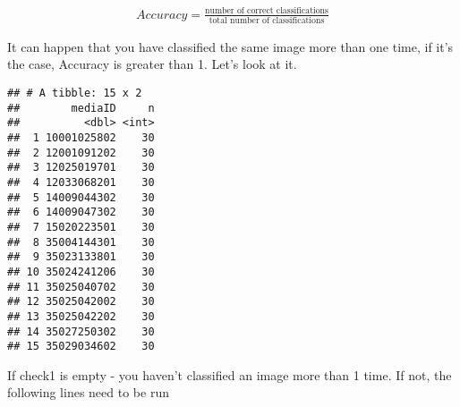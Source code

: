 \documentclass[]{article}
\newenvironment{Shaded}{\begin{snugshade}}{\end{snugshade}}
\newcommand{\KeywordTok}[1]{\textcolor[rgb]{0.13,0.29,0.53}{\textbf{#1}}}
\newcommand{\DataTypeTok}[1]{\textcolor[rgb]{0.13,0.29,0.53}{#1}}
\newcommand{\DecValTok}[1]{\textcolor[rgb]{0.00,0.00,0.81}{#1}}
\newcommand{\OperatorTok}[1]{\textcolor[rgb]{0.81,0.36,0.00}{\textbf{#1}}}
\newcommand{\NormalTok}[1]{#1}
\begin{document}
\[
\begin{aligned}
Accuracy=\frac{\text{number of correct classifications}}{\text{total number of classifications}}
\end{aligned}
\]

\begin{Shaded}
\end{Shaded}

It can happen that you have classified the same image more than one
time, if it's the case, Accuracy is greater than 1. Let's look at it.

\begin{Shaded}
\end{Shaded}

\begin{verbatim}
## # A tibble: 15 x 2
##        mediaID     n
##          <dbl> <int>
##  1 10001025802    30
##  2 12001091202    30
##  3 12025019701    30
##  4 12033068201    30
##  5 14009044302    30
##  6 14009047302    30
##  7 15020223501    30
##  8 35004144301    30
##  9 35023133801    30
## 10 35024241206    30
## 11 35025040702    30
## 12 35025042002    30
## 13 35025042202    30
## 14 35027250302    30
## 15 35029034602    30
\end{verbatim}

If check1 is empty - you haven't classified an image more than 1 time.
If not, the following lines need to be run

\begin{Shaded}
\end{Shaded}
\end{document}
